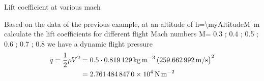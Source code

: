 \documentclass[[12pt,twoside]{book}
\begin{document}
%

%
\begin{myExampleX}{Lift coefficient at various mach } {}%
\label{example:Equivalent:Airspeed:Basic:B}
%

\noindent
Based on the data of the previous example, at an altitude of h=\SI[round-precision=0]{\myAltitudeM}{m} calculate the lift coefficients for different flight Mach numbers M= {0.3 ; 0.4  ; 0.5 ; 0.6 ; 0.7 ; 0.8 }
we  have a dynamic flight pressure
\[
\begin{split}
\bar{q} = \frac{1}{2} \rho V^2 
  & {}=
  \num{0.5} \cdot \SI[round-precision=3]{\myDensityKGMC}{\kilogram\,\meter^{-3}}
    \, (\SI[round-precision=2]{\mySpeedMS}{\meter/\second}\big)^2
\\
  & {}=
    { 
      \SI[round-precision=3,scientific-notation=true]{\myDynamicPressurePa}{\newton\,\meter^{-2}} 
    }
    
\end{split}
\]


















\end{myExampleX}
\end{document}

